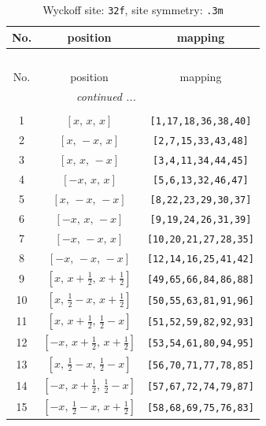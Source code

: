 \documentclass[fleqn,8pt]{jsarticle}
\begin{document}
\begin{longtable}{ccc}
\caption{Wyckoff site: {\tt 32f}, site symmetry: {\tt .3m}}
 \\
 \hline \hline
No. & position & mapping \\ \hline \endfirsthead

\multicolumn{2}{l}{\tablename\ \thetable{}} \\
 \hline \hline
No. & position & mapping \\ \hline \endhead

 \hline \hline
\multicolumn{2}{r}{\footnotesize\it continued ...} \\ \endfoot

 \hline \hline
\multicolumn{2}{r}{} \\ \endlastfoot

1 & $\left[ x,\, x,\, x \right]$ & {\tt [1,17,18,36,38,40]} \\ \hline
2 & $\left[ x,\, - x,\, x \right]$ & {\tt [2,7,15,33,43,48]} \\ \hline
3 & $\left[ x,\, x,\, - x \right]$ & {\tt [3,4,11,34,44,45]} \\ \hline
4 & $\left[ - x,\, x,\, x \right]$ & {\tt [5,6,13,32,46,47]} \\ \hline
5 & $\left[ x,\, - x,\, - x \right]$ & {\tt [8,22,23,29,30,37]} \\ \hline
6 & $\left[ - x,\, x,\, - x \right]$ & {\tt [9,19,24,26,31,39]} \\ \hline
7 & $\left[ - x,\, - x,\, x \right]$ & {\tt [10,20,21,27,28,35]} \\ \hline
8 & $\left[ - x,\, - x,\, - x \right]$ & {\tt [12,14,16,25,41,42]} \\ \hline
9 & $\left[ x,\, x + \frac{1}{2},\, x + \frac{1}{2} \right]$ & {\tt [49,65,66,84,86,88]} \\ \hline
10 & $\left[ x,\, \frac{1}{2} - x,\, x + \frac{1}{2} \right]$ & {\tt [50,55,63,81,91,96]} \\ \hline
11 & $\left[ x,\, x + \frac{1}{2},\, \frac{1}{2} - x \right]$ & {\tt [51,52,59,82,92,93]} \\ \hline
12 & $\left[ - x,\, x + \frac{1}{2},\, x + \frac{1}{2} \right]$ & {\tt [53,54,61,80,94,95]} \\ \hline
13 & $\left[ x,\, \frac{1}{2} - x,\, \frac{1}{2} - x \right]$ & {\tt [56,70,71,77,78,85]} \\ \hline
14 & $\left[ - x,\, x + \frac{1}{2},\, \frac{1}{2} - x \right]$ & {\tt [57,67,72,74,79,87]} \\ \hline
15 & $\left[ - x,\, \frac{1}{2} - x,\, x + \frac{1}{2} \right]$ & {\tt [58,68,69,75,76,83]} \\ \hline

\end{longtable}
\end{document}
